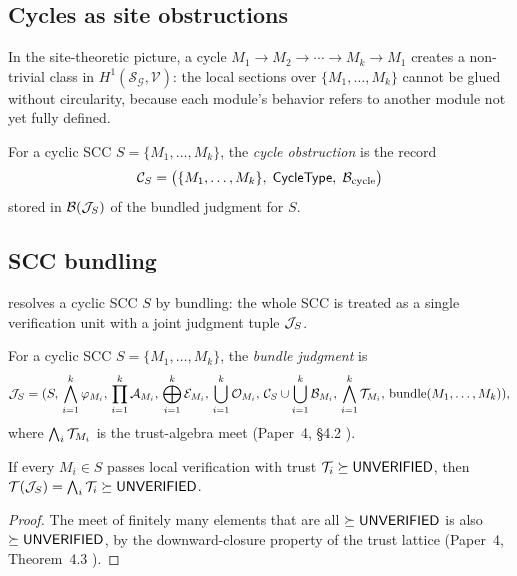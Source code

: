 \documentclass[11pt]{article}
\newcommand{\IG}{\mathcal{G}}              %
\newcommand{\CyclObs}{\mathcal{C}}         %
\newcommand{\ModSite}{\mathcal{S}_{\IG}}   %
\newcommand{\tgeq}{\succeq}              %
\begin{document}
\subsection{Cycles as site obstructions}

In the site-theoretic picture, a cycle
$M_1 \to M_2 \to \cdots \to M_k \to M_1$
creates a non-trivial class in $H^1(\ModSite, \mathcal{V})$: the local
sections over $\{M_1, \ldots, M_k\}$ cannot be glued without
circularity, because each module's behavior refers to another module
not yet fully defined.

\begin{definition}
\label{def:cycle-obstruction}
For a cyclic SCC $S = \{M_1, \ldots, M_k\}$, the
\emph{cycle obstruction} is the record
\[
  \CyclObs_S =
  \bigl(\{M_1,\ldots,M_k\},\;
        \mathsf{CycleType},\;
        \obstr_{\mathrm{cycle}}\bigr)
\]
stored in $\mathcal{B}(\mathcal{J}_S)$ of the bundled judgment for $S$.
\end{definition}

\subsection{SCC bundling}

\JuGeo{} resolves a cyclic SCC $S$ by bundling: the whole SCC is
treated as a single verification unit with a joint judgment tuple
$\mathcal{J}_S$.

\begin{definition}
\label{def:bundle}
For a cyclic SCC $S = \{M_1, \ldots, M_k\}$, the
\emph{bundle judgment} is
\[
  \J_S = \Jud{S}
             {\bigwedge_{i=1}^k \varphi_{M_i}}
             {\prod_{i=1}^k \carrier_{M_i}}
             {\bigoplus_{i=1}^k \evid_{M_i}}
             {\bigcup_{i=1}^k \oblig_{M_i}}
             {\CyclObs_S \cup \bigcup_{i=1}^k \obstr_{M_i}}
             {\bigwedge_{i=1}^k \trust_{M_i}}
             {\mathrm{bundle}(M_1,\ldots,M_k)},
\]
where $\bigwedge_i \mathcal{T}_{M_i}$ is the trust-algebra meet
(Paper~4, \S4.2 \cite{paper04}).
\end{definition}

\begin{proposition}
\label{prop:bundle-sound}
If every $M_i \in S$ passes local verification with trust
$\trust_i \tgeq \Tunver$, then
$\trust(\J_S) = \bigwedge_i \trust_i \tgeq \Tunver$.
\end{proposition}

\begin{proof}
The meet of finitely many elements that are all $\tgeq \Tunver$ is
also $\tgeq \Tunver$, by the downward-closure property of the trust
lattice (Paper~4, Theorem~4.3 \cite{paper04}).
\end{proof}
\end{document}
